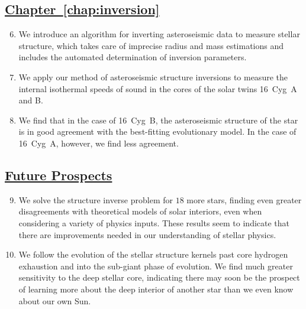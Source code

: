 \subsection*{\hspace*{0.5cm}\hyperref[chap:inversion]{Chapter~\ref{chap:inversion}} \citep{2017ApJ...851...80B}}
\begin{enumerate}
    \setcounter{enumi}{5}
    \item We introduce an algorithm for inverting asteroseismic data to measure stellar structure, which takes care of imprecise radius and mass estimations and includes the automated determination of inversion parameters. 
    \item We apply our method of asteroseismic structure inversions to measure the internal isothermal speeds of sound in the cores of the solar twins 16~Cyg~A and B. 
    \item We find that in the case of 16~Cyg~B, the asteroseismic structure of the star is in good agreement with the best-fitting evolutionary model. In the case of 16~Cyg~A, however, we find less agreement. 
\end{enumerate}

\subsection*{\hspace*{0.5cm}\hyperref[chap:prospective]{Future Prospects}}
\begin{enumerate}
    \setcounter{enumi}{8}
    \item We solve the structure inverse problem for $18$ more stars, finding even greater disagreements with theoretical models of solar interiors, even when considering a variety of physics inputs. 
    These results seem to indicate that there are improvements needed in our understanding of stellar physics. 
    \item We follow the evolution of the stellar structure kernels past core hydrogen exhaustion and into the sub-giant phase of evolution. 
    We find much greater sensitivity to the deep stellar core, indicating there may soon be the prospect of learning more about the deep interior of another star than we even know about our own Sun. 
\end{enumerate}
